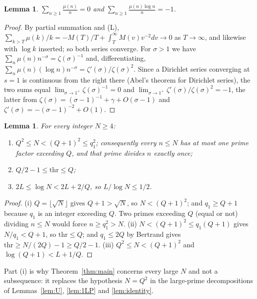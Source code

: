 \documentclass[11pt,a4paper]{article}
\theoremstyle{plain}
\newtheorem{lemma}[theorem]{Lemma}
\theoremstyle{definition}
\theoremstyle{remark}
\newcommand{\thr}{\mathrm{thr}}
\begin{document}
\begin{lemma}\label{lem:mobconst}
$\displaystyle\sum_{n\ge1}\frac{\mu(n)}n=0$ and $\displaystyle\sum_{n\ge1}\frac{\mu(n)\log n}n=-1$.
\end{lemma}

\begin{proof}
By partial summation and (L), $\sum_{k>T}\mu(k)/k=-M(T)/T+\int_{T}^{\infty}M(v)v^{-2}dv\to0$ as
$T\to\infty$, and likewise with $\log k$ inserted; so both series converge. For $\sigma>1$ we have
$\sum_{n}\mu(n)n^{-\sigma}=\zeta(\sigma)^{-1}$ and, differentiating,
$\sum_{n}\mu(n)(\log n)n^{-\sigma}=\zeta'(\sigma)/\zeta(\sigma)^{2}$. Since a Dirichlet series converging
at $s=1$ is continuous from the right there (Abel's theorem for Dirichlet series), the two sums equal
$\lim_{\sigma\to1^{+}}\zeta(\sigma)^{-1}=0$ and
$\lim_{\sigma\to1^{+}}\zeta'(\sigma)/\zeta(\sigma)^{2}=-1$, the latter from
$\zeta(\sigma)=(\sigma-1)^{-1}+\gamma+O(\sigma-1)$ and $\zeta'(\sigma)=-(\sigma-1)^{-2}+O(1)$.
\end{proof}

\begin{lemma}\label{lem:elem}
For every integer $N\ge4$:
\begin{enumerate}
\item[(i)] $Q^{2}\le N<(Q+1)^{2}\le q_{1}^{2}$; consequently every $n\le N$ has at most one prime factor
exceeding $Q$, and that prime divides $n$ exactly once;
\item[(ii)] $Q/2-1\le\thr\le Q$;
\item[(iii)] $2L\le\log N<2L+2/Q$, so $L/\log N\le1/2$.
\end{enumerate}
\end{lemma}

\begin{proof}
(i) $Q=\lfloor\sqrt N\rfloor$ gives $Q+1>\sqrt N$, so $N<(Q+1)^{2}$; and $q_{1}\ge Q+1$ because $q_{1}$ is
an integer exceeding $Q$. Two primes exceeding $Q$ (equal or not) dividing $n\le N$ would force
$n\ge q_{1}^{2}>N$. (ii) $N<(Q+1)^{2}\le q_{1}(Q+1)$ gives $N/q_{1}<Q+1$, so $\thr\le Q$; and
$q_{1}\le2Q$ by Bertrand gives $\thr\ge N/(2Q)-1\ge Q/2-1$. (iii) $Q^{2}\le N<(Q+1)^{2}$ and
$\log(Q+1)<L+1/Q$.
\end{proof}

Part (i) is why Theorem~\ref{thm:main} concerns every large $N$ and not a subsequence: it replaces the
hypothesis $N=Q^{2}$ in the large-prime decompositions of Lemmas~\ref{lem:U}, \ref{lem:1LP} and
\ref{lem:identity}.
\end{document}
